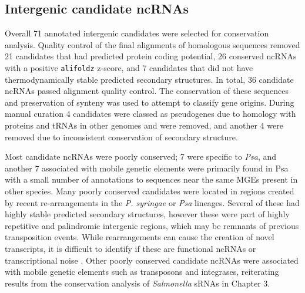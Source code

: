 \subsection{Intergenic candidate ncRNAs}

Overall 71 annotated intergenic candidates were selected for conservation analysis. Quality control of the final alignments of homologous sequences removed 21 candidates that had predicted protein coding potential, 26 conserved ncRNAs with a positive \texttt{alifoldz} z-score, and 7 candidates that did not have thermodynamically stable predicted secondary structures. In total, 36 candidate ncRNAs passed alignment quality control. The conservation of these sequences and preservation of synteny was used to attempt to classify gene origins. During manual curation 4 candidates were classed as pseudogenes due to homology with proteins and tRNAs in other genomes and were removed, and another 4 were removed due to inconsistent conservation of secondary structure. 

Most candidate ncRNAs were poorly conserved; 7 were specific to \textit{Psa}, and another 7 associated with mobile genetic elements were primarily found in {Psa} with a small number of annotations to sequences near the same MGEs present in other species. Many poorly conserved candidates were located in regions created by recent re-arrangements in the \textit{P. syringae} or \textit{Psa} lineages. Several of these had highly stable predicted secondary structures, however these were part of highly repetitive and palindromic intergenic regions, which may be remnants of previous transposition events. While rearrangements can cause the creation of novel transcripts, it is difficult to identify if these are functional ncRNAs or transcriptional noise \citep{Jose2019-xxxu}. Other poorly conserved candidate ncRNAs were associated with mobile genetic elements such as transposons and integrases, reiterating results from the conservation analysis of \textit{Salmonella} sRNAs in Chapter 3. 

